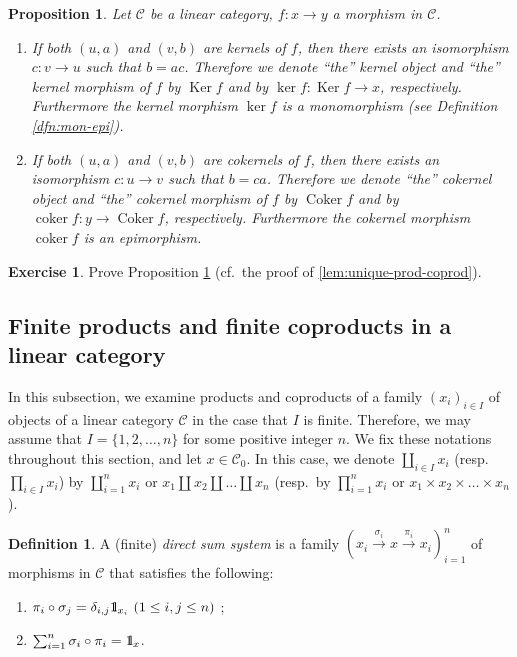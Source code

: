 \documentclass{surv-l}
\numberwithin{equation}{chapter}
\numberwithin{figure}{chapter}
\theoremstyle{plain}
\newtheorem{prp}[thm]{Proposition}
\theoremstyle{definition}
\newtheorem{dfn}[thm]{Definition}
\newtheorem{exc}[thm]{Exercise}
\theoremstyle{remark}
\newcommand{\id}{1\kern-.25em{\text{{\rm l}}}}
\DeclareMathOperator{\Ker}{Ker}
\DeclareMathOperator{\Cok}{Coker}
\DeclareMathOperator{\cok}{coker}
\begin{document}
\begin{prp}\label{prp:ker-cok-unique}
Let ${\mathcal{C}}$ be a linear category, $f \colon x \to y$ a morphism in ${\mathcal{C}}$.
\begin{enumerate}
\item
If both $(u, a)$ and $(v, b)$ are kernels of $f$, then
there exists an isomorphism $c \colon v \to u$ such that $b = ac$.
Therefore we denote ``the'' kernel object and ``the'' kernel morphism of $f$
by $\Ker f$ and by $\ker f \colon \Ker f \to x$, respectively.
Furthermore the kernel morphism $\ker f$ is a monomorphism
{\em (see Definition \ref{dfn:mon-epi})}.
\item
If both $(u, a)$ and $(v, b)$ are cokernels of $f$, then
there exists an isomorphism $c \colon u \to v$ such that $b = ca$.
Therefore we denote ``the'' cokernel object and ``the'' cokernel morphism of $f$
by $\Cok f$ and by $\cok f \colon y \to \Cok f$, respectively.
Furthermore the cokernel morphism $\cok f$ is an epimorphism.
\end{enumerate}
\end{prp}

\begin{exc}
Prove Proposition \ref{prp:ker-cok-unique}
(cf.\ the proof of \ref{lem:unique-prod-coprod}).
\end{exc}

\subsection{Finite products and finite coproducts in a linear category}

In this subsection, we examine products and coproducts
of a family $(x_i)_{i \in I}$ of objects of a linear category ${\mathcal{C}}$ in the case that $I$ is finite.
Therefore, we may assume that $I = \{1, 2,\dots, n\}$ for some positive integer $n$.
We fix these notations throughout this section, and let $x \in {\mathcal{C}}_0$.
In this case, we denote $\coprod_{i\in I}x_i$ (resp.\ $\prod_{i\in I}x_i$) by
$\coprod_{i=1}^n x_i$ or $x_1 \amalg x_2 \amalg \dots \amalg x_n$
(resp.\ by $\prod_{i=1}^n x_i$ or $x_1 \times x_2 \times \dots \times x_n$).

\begin{dfn}
A (finite) \emph{direct sum system} is a family $(x_i \xrightarrow{\sigma_i} x \xrightarrow{\pi_i} x_i)_{i=1}^n$ of
morphisms in ${\mathcal{C}}$ that satisfies the following:

\begin{enumerate}
\item
$\pi_i \circ \sigma_j = \delta_{i,j}\id_{x_i}\ (1 \le i, j \le n)$
; 
\item
$\sum_{i=1}^n \sigma_i \circ \pi_i = \id_x$.
\end{enumerate}
\end{dfn}
\end{document}
